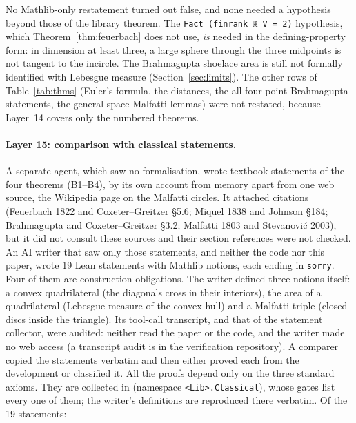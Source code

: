 \documentclass[11pt]{article}
\theoremstyle{definition}
\theoremstyle{remark}
\newcommand{\lean}[1]{\texttt{#1}}
\begin{document}
No Mathlib-only restatement turned out false, and none needed a hypothesis beyond those of the library
theorem. The \lean{Fact (finrank ℝ V = 2)} hypothesis, which Theorem~\ref{thm:feuerbach} does not use,
\emph{is} needed in the defining-property form: in dimension at least three, a large sphere through the
three midpoints is not tangent to the incircle. The Brahmagupta shoelace area is still not formally identified with
Lebesgue measure (Section~\ref{sec:limits}). The other rows of Table~\ref{tab:thms} (Euler's formula, the distances, the
all-four-point Brahmagupta statements, the general-space Malfatti lemmas) were not restated, because
Layer~14 covers only the numbered theorems.

\paragraph{Layer 15: comparison with classical statements.} A separate agent, which saw no formalisation,
wrote textbook statements of the four theorems (B1--B4), by its own account from memory apart from one
web source, the Wikipedia page on the Malfatti circles. It attached citations (Feuerbach 1822 and
Coxeter--Greitzer \S5.6; Miquel 1838 and Johnson \S184; Brahmagupta and Coxeter--Greitzer \S3.2;
Malfatti 1803 and Stevanovi\'c 2003), but it did not consult these sources and their section references
were not checked. An AI writer that saw only those statements, and neither the code
nor this paper, wrote 19 Lean statements with Mathlib notions, each ending in \lean{sorry}. Four of them
are construction obligations. The writer defined three notions itself: a convex quadrilateral (the
diagonals cross in their interiors), the area of a quadrilateral (Lebesgue measure of the convex hull)
and a Malfatti triple (closed discs inside the triangle). Its tool-call transcript, and that of the statement collector, were audited: neither read the paper or
the code, and the writer made no web access (a transcript audit is in the verification repository). A comparer copied
the statements verbatim and then either proved each from the development or classified it. All the proofs
depend only on the three standard axioms. They are collected in 
(namespace \lean{<Lib>.Classical}), whose gates list every one of them; the writer's definitions are
reproduced there verbatim. Of the 19 statements:
\end{document}
